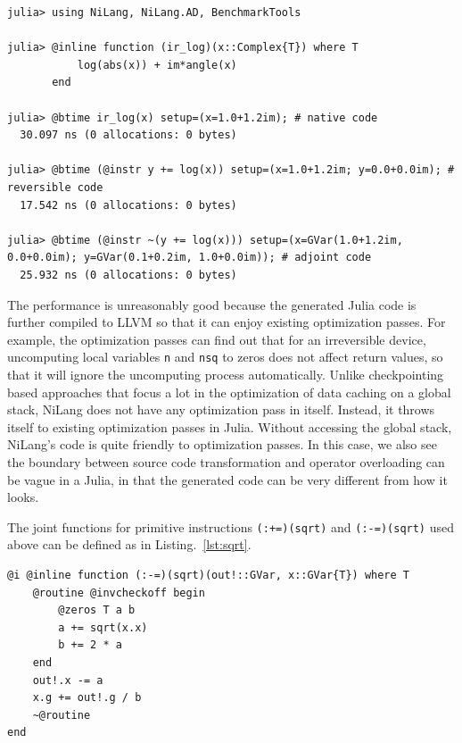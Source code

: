 \documentclass{article}
\newcommand{\<}{\langle}
\renewcommand{\>}{\rangle}
\newcommand{\Lst}[1]{Listing.~\ref{#1}}
\theoremstyle{definition}\newtheorem{definition}{\textit{Definition}}
\begin{document}
\begin{minipage}{.88\textwidth}
\begin{lstlisting}[mathescape=true,caption={Time and allocation to differentiate complex valued log.},label={lst:time-complex}, frame=tlrb]
julia> using NiLang, NiLang.AD, BenchmarkTools

julia> @inline function (ir_log)(x::Complex{T}) where T
           log(abs(x)) + im*angle(x)
       end

julia> @btime ir_log(x) setup=(x=1.0+1.2im); # native code
  30.097 ns (0 allocations: 0 bytes)

julia> @btime (@instr y += log(x)) setup=(x=1.0+1.2im; y=0.0+0.0im); # reversible code
  17.542 ns (0 allocations: 0 bytes)

julia> @btime (@instr ~(y += log(x))) setup=(x=GVar(1.0+1.2im, 0.0+0.0im); y=GVar(0.1+0.2im, 1.0+0.0im)); # adjoint code
  25.932 ns (0 allocations: 0 bytes)
\end{lstlisting}
\end{minipage}

The performance is unreasonably good because the generated Julia code is further compiled to LLVM so that it can enjoy existing optimization passes.
For example, the optimization passes can find out that for an irreversible device, uncomputing local variables \texttt{n} and \texttt{nsq} to zeros does not affect return values, so that it will ignore the uncomputing process automatically.
Unlike checkpointing based approaches that focus a lot in the optimization of data caching on a global stack, NiLang does not have any optimization pass in itself.
Instead, it throws itself to existing optimization passes in Julia. Without accessing the global stack, NiLang's code is quite friendly to optimization passes.
In this case, we also see the boundary between source code transformation and operator overloading can be vague in a Julia, in that the generated code can be very different from how it looks.

The joint functions for primitive instructions \texttt{(:+=)(sqrt)} and \texttt{(:-=)(sqrt)} used above can be defined as in \Lst{lst:sqrt}.

\begin{minipage}{.88\textwidth}
    \begin{lstlisting}[mathescape=true,caption={Adjoints for primitives \texttt{(:+=)(sqrt)} and \texttt{(:-=)(sqrt)}.},label={lst:sqrt}, frame=tlrb]
@i @inline function (:-=)(sqrt)(out!::GVar, x::GVar{T}) where T
    @routine @invcheckoff begin
        @zeros T a b
        a += sqrt(x.x)
        b += 2 * a
    end
    out!.x -= a
    x.g += out!.g / b
    ~@routine
end
\end{lstlisting}
\end{minipage}
\end{document}

